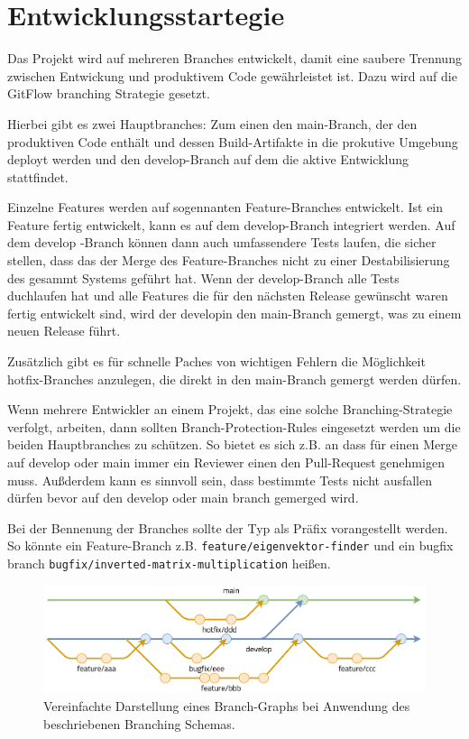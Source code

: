 \chapter{Entwicklungsstartegie}
\label{chap:git-strat}

Das Projekt wird auf mehreren Branches entwickelt, damit eine saubere Trennung zwischen Entwickung und produktivem Code gewährleistet ist. Dazu wird auf die GitFlow branching Strategie gesetzt\cite{Atlassian2024}. 

Hierbei gibt es zwei Hauptbranches: Zum einen den \glqq main\grqq-Branch, der den produktiven Code enthält und dessen Build-Artifakte in die prokutive Umgebung deployt werden und den \glqq develop\grqq-Branch auf dem die aktive Entwicklung stattfindet. 

Einzelne Features werden auf sogennanten Feature-Branches entwickelt. Ist ein Feature fertig entwickelt, kann es auf dem \glqq develop\grqq-Branch integriert werden. Auf dem \glqq develop \grqq-Branch können dann auch umfassendere Tests laufen, die sicher stellen, dass das der Merge des Feature-Branches nicht zu einer Destabilisierung des gesammt Systems geführt hat. Wenn der \glqq develop\grqq-Branch alle Tests duchlaufen hat und alle Features die für den nächsten Release gewünscht waren fertig entwickelt sind, wird der \glqq develop\grqq in den \glqq main\grqq-Branch gemergt, was zu einem neuen Release führt.

Zusätzlich gibt es für schnelle Paches von wichtigen Fehlern die Möglichkeit \glqq hotfix\grqq-Branches anzulegen, die direkt in den \glqq main\grqq-Branch gemergt werden dürfen.

Wenn mehrere Entwickler an einem Projekt, das eine solche Branching-Strategie verfolgt, arbeiten, dann sollten Branch-Protection-Rules eingesetzt werden um die beiden Hauptbranches zu schützen. So bietet es sich z.B. an dass für einen Merge auf \glqq develop\grqq{} oder \glqq main\grqq{} immer ein Reviewer einen den Pull-Request genehmigen muss. Außderdem kann es sinnvoll sein, dass bestimmte Tests nicht ausfallen dürfen bevor auf den \glqq develop\grqq{} oder \glqq main\grqq{} branch gemerged wird.

Bei der Bennenung der Branches sollte der Typ als Präfix vorangestellt werden. So könnte ein Feature-Branch z.B. \lstinline{feature/eigenvektor-finder} und ein bugfix branch \lstinline{bugfix/inverted-matrix-multiplication} heißen.

\begin{figure}
    \includegraphics[scale=0.25]{res/branching_scheme.drawio.png}
    \caption{Vereinfachte Darstellung eines Branch-Graphs bei Anwendung des beschriebenen Branching Schemas.}
\end{figure}
